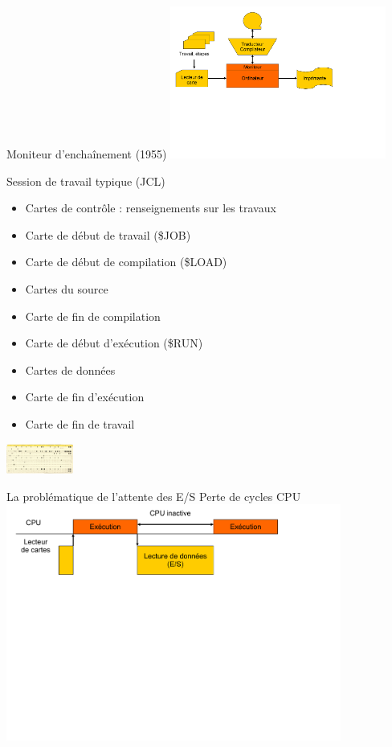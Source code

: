 \begin{frame}{Moniteur d’enchaînement (1955)}
\includegraphics[height=5cm]{../illustration/moniteur_enchainement.pdf}
\end{frame}

\begin{frame}{Session de travail typique (JCL)}
\begin{itemize}
\item Cartes de contrôle : renseignements sur les travaux
\item Carte de début de travail (\$JOB)
\item Carte de début de compilation (\$LOAD)
\item Cartes du source
\item Carte de fin de compilation
\item Carte de début d’exécution (\$RUN)
\item Cartes de données
\item Carte de fin d’exécution
\item Carte de fin de travail
\end{itemize}
\includegraphics[height=1cm]{../illustration/carte_jcl.png}
\end{frame}

\begin{frame}{La problématique de l'attente des E/S}
Perte de cycles CPU
\includegraphics[width=11cm]{../illustration/attente_es.pdf}
\end{frame}

